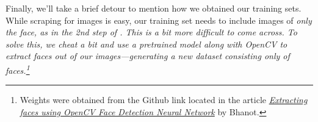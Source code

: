 Finally, we'll take a brief detour to mention how we obtained our training sets.
While scraping for images is easy, our training set needs to include images of \it{only} the face, as in the 2nd step of .
This is a bit more difficult to come across.
To solve this, we cheat a bit and use a pretrained model along with OpenCV to extract faces out of our images---generating a new dataset consisting only of faces.\footnote{Weights were obtained from the Github link located in the article \href{https://towardsdatascience.com/extracting-faces-using-opencv-face-detection-neural-network-475c5cd0c260}{\it{Extracting faces using OpenCV Face Detection Neural Network}} by Bhanot.}